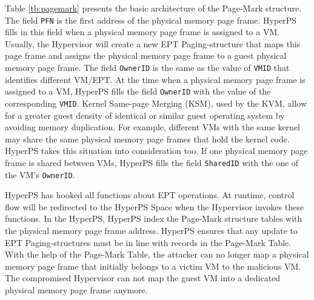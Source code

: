 Table \ref{tb:pagemark} presents the basic architecture of the Page-Mark structure.
The field \verb|PFN| is the first address of the physical memory page frame. HyperPS fills in this field when a physical memory page frame is assigned to a VM. Usually, the Hypervisor will create a new EPT Paging-structure that maps this page frame and assigns the physical memory page frame to a guest physical memory page frame. The field \verb|OwnerID| is the same as the value of \verb|VMID| that identifies different VM/EPT. At the time when a physical memory page frame is assigned to a VM, HyperPS fills the field \verb|OwnerID| with the value of the corresponding \verb|VMID|. 
Kernel Same-page Merging (KSM), used by the KVM, allow for a greater guest density of identical or similar guest operating system by avoiding memory duplication.
For example, different VMs with the same kernel may share the same physical memory page frames that hold the kernel code. HyperPS takes this situation into consideration too. If one physical memory page frame is shared between VMs, HyperPS fills the field \verb|SharedID| with the one of the VM's \verb|OwnerID|.

HyperPS has hooked all functions about EPT operations.
At runtime, control flow will be redirected to the HyperPS Space when the Hypervisor invokes these functions. 
In the HyperPS, HyperPS index the Page-Mark structure tables with the physical memory page frame address. 
HyperPS ensures that any update to EPT Paging-structures must be in line with records in the Page-Mark Table.
With the help of the Page-Mark Table, the attacker can no longer map a physical memory page frame that initially belongs to a victim VM to the malicious VM. The compromised Hypervisor can not map the guest VM into a dedicated physical memory page frame anymore. 

\begin{table}[]
    \caption{Page-Mark Structure}
    \label{tb:pagemark}
\end{table}

